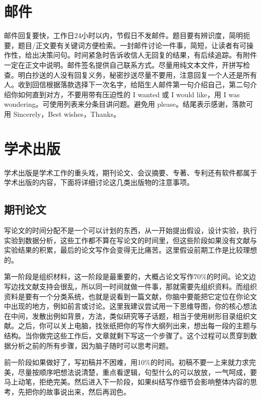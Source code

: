\documentclass[]{tufte-book}
\begin{document}
\hypertarget{ux90aeux4ef6}{%
\section{邮件}\label{ux90aeux4ef6}}

邮件回复要快，工作日24小时以内，节假日不发邮件。题目要有辨识度，简明扼要，题目/正文要有关键词方便检索。一封邮件讨论一件事，简短，让读者有可操作性，给出决策问句。时间紧急时告诉收信人无回复的结果，有后续追踪。有附件一定在正文中说明。邮件签名提供自己联系方式。尽量用纯文本文件，开拼写检查。明白抄送的人没有回复义务，秘密抄送尽量不要用，注意回复一个人还是所有人。收到回信根据落款选择下一次名字，给陌生人邮件第一句介绍自己，第二句介绍你如何直到对方，不要用带有压迫性的 I wanted 或 I would like，用 I was wondering。可使用列表来分条目讲问题。避免用 please。结尾表示感谢，落款可用 Sincerely，Best wishes，Thanks。

\hypertarget{ux5b66ux672fux51faux7248}{%
\section{学术出版}\label{ux5b66ux672fux51faux7248}}

学术出版是学术工作的重头戏，期刊论文、会议摘要、专著、专利还有软件都属于学术出版的内容，下面将详细讨论这几类出版物的注意事项。

\hypertarget{ux671fux520aux8bbaux6587}{%
\subsection{期刊论文}\label{ux671fux520aux8bbaux6587}}

写论文的时间分配不是一个可以计划的东西，从一开始提出假设，设计实验，执行实验到数据分析，这些工作都不算在写论文的时间里，但这些阶段如果没有文献与实验结果的积累，最后的论文写作会变得无比痛苦。这里假设前期工作是比较理想的。

第一阶段是组织材料，这一阶段是最重要的，大概占论文写作70\%的时间。论文边写边找文献支持会很乱，所以同一时间就做一件事，那就需要先组织资料。而组织资料是要有一个分类系统，也就是说看到一篇文献，你脑中要能把它定位在你论文中出现的地方，例如前言或讨论。这里我建议尝试用一下思维导图，你的核心想法在中间，发散出例如背景，方法，类似研究等子话题，相当于使用树形目录组织文献。之后，你可以关上电脑，找张纸把你的写作大纲列出来，想出每一段的主题与结构。当你做完这些工作后，文章就剩下写这一个步骤了。这个过程可以贯穿到数据分析之前的所有步骤，因为脑子随时可以思考问题。

前一阶段如果做好了，写初稿并不困难，用10\%的时间。初稿不要一上来就力求完美，尽量按顺序吧想法说清楚，重点看逻辑，句型什么的可以放放，一气呵成，要马上动笔，拒绝完美。然后进入下一阶段，如果纠结写作细节会影响整体内容的思考，先把你的故事说出来，然后再润色。
\end{document}
